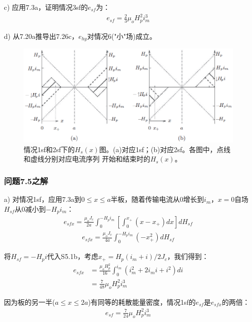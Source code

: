 c) 应用7.3a，证明情况3sf的$e_{sf}$为：
\begin{align*}%
e_{sf}=\frac{2}{3}\mu_oH_{p}^{2}i_{m}^{3} \tag{7.26c}
\end{align*}

d) 从7.20a推导出7.26c，$e_{hy}$对情况6("小"场)成立。
\begin{figure}[htbp]
	\centering
	\includegraphics[scale=0.6]{chpt7/figs/fig7.17.eps}
	\caption{情况1sf和2sf下的$H_s(x)$图。(a)对应1sf；(b)对应2sf。各图中，点线和虚线分别对应电流序列
		开始和结束时的$H_s(x)$。}
\end{figure}


\subsubsection{问题7.5之解}
a) 对情况1sf，应用7.3a到$0\le x\le a$半板，随着传输电流从0增长到$i_m$，$x=0$自场$H_{sf}$从0减小到$-H_p i_m$：
\begin{align*}%
e_{sfx}=\frac{\mu_oJ_c}{2a}\int_{0}^{-H_pi_m}\left[\int_{0}^{x_+}(x-x_+)dx\right]dH_{sf}  \tag{S5.1a}
\end{align*}
\begin{align*}
e_{sfx}=\frac{\mu_oJ_c}{4a}\int_{0}^{-H_pi_m}(-x_{+}^{2})dH_{sf} \tag{S5.1b}
\end{align*}

将$H_{sf}=-H_p i$代入S5.1b，考虑$x_+=H_p(i_m+i)/2J_c$，我们得到：
\begin{align*}%
e_{sfx}&=\frac{\mu_oH_{p}^{2}}{16}\int_{0}^{i_m}(i_{m}^{2}+2i_mi+i^2)di \\
&=\frac{7}{48}\mu_oH_{p}^{2}i_{m}^{3} \tag{S5.2}
\end{align*}

因为板的另一半($a\le x\le 2a$)有同等的耗散能量密度，情况1sf的$e_{sf}$是$e_{sfx}$的两倍：
\begin{align*}%
e_{sf}=\frac{7}{24}\mu_oH_{p}^{2}i_{m}^{3} \tag{7.26a}
\end{align*}

